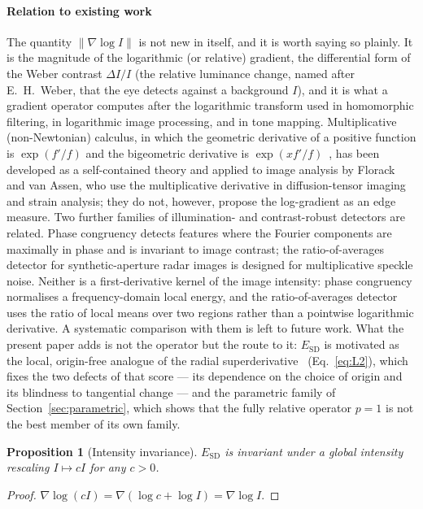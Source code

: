 \documentclass[conference]{IEEEtran}
\newtheorem{proposition}{Proposition}
\begin{document}
\paragraph*{Relation to existing work}
The quantity $\|\nabla\log I\|$ is not new in itself, and it is worth saying
so plainly.  It is the magnitude of the logarithmic (or relative) gradient,
the differential form of the Weber contrast $\Delta I/I$ (the relative luminance
change, named after E.~H.~Weber, that the eye detects against a background
$I$)\cite{fechner}, and it
is what a gradient operator computes after the logarithmic transform used in
homomorphic filtering\cite{homomorphic}, in logarithmic image
processing\cite{jourlin}, and in tone mapping\cite{reinhard}.  Multiplicative
(non-Newtonian) calculus, in which the geometric derivative of a positive
function is $\exp(f'/f)$ and the bigeometric derivative is
$\exp(xf'/f)$~\cite{grossman,bashirov2008}, has been developed as a self-contained
theory and applied to image analysis by Florack and van Assen\cite{florack},
who use the multiplicative derivative in diffusion-tensor imaging and strain
analysis; they do not, however, propose the log-gradient as an edge measure.
Two further families of illumination- and contrast-robust detectors are related.
Phase congruency detects features where the Fourier components are maximally in
phase and is invariant to image contrast\cite{kovesi}; the ratio-of-averages
detector for synthetic-aperture radar images is designed for multiplicative
speckle noise\cite{touzi}.  Neither is a first-derivative kernel of the image
intensity: phase congruency normalises a frequency-domain local energy, and the
ratio-of-averages detector uses the ratio of local means over two regions rather
than a pointwise logarithmic derivative.  A systematic comparison with them is left
to future work.
What the present paper adds is not the operator but the route to it:
$E_{\mathrm{SD}}$ is motivated as the local, origin-free analogue of the
radial superderivative~\cite{zotkin,grossman} (Eq.~\eqref{eq:L2}), which fixes
the two defects of that score --- its dependence on the choice of origin and its
blindness to tangential change --- and the parametric family of
Section~\ref{sec:parametric}, which shows that the fully relative operator
$p=1$ is not the best member of its own family.

\begin{proposition}[Intensity invariance]
$E_{\mathrm{SD}}$ is invariant under a global intensity rescaling
$I\mapsto cI$ for any $c>0$.
\end{proposition}
\begin{proof}
$\nabla\log(cI)=\nabla(\log c+\log I)=\nabla\log I$.
\end{proof}
\end{document}
